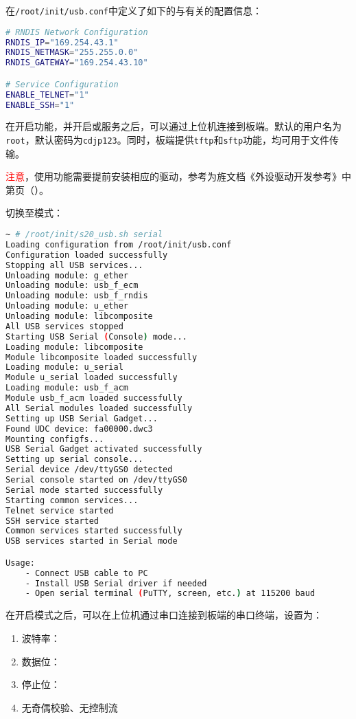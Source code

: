 \documentclass[UTF8]{ctexart}
\newcommand{\code}[1]{\colorbox{gray!10}{\lstinline[style=inlinecode]|#1|}}
\begin{document}
\noindent 在\code{/root/init/usb.conf}中定义了如下的与有关的配置信息：

\begin{lstlisting}[language=sh]
# RNDIS Network Configuration
RNDIS_IP="169.254.43.1"
RNDIS_NETMASK="255.255.0.0"
RNDIS_GATEWAY="169.254.43.10"

# Service Configuration
ENABLE_TELNET="1"
ENABLE_SSH="1"
\end{lstlisting}

\noindent 在开启功能，并开启或服务之后，可以通过上位机连接到板端。默认的用户名为\code{root}，默认密码为\code{cdjp123}。同时，板端提供\code{tftp}和\code{sftp}功能，均可用于文件传输。

\textcolor{red}{注意}，使用功能需要提前安装相应的驱动，参考为旌文档《外设驱动开发参考》中第页（）。

切换至模式：

\begin{lstlisting}[language=sh]
~ # /root/init/s20_usb.sh serial
Loading configuration from /root/init/usb.conf
Configuration loaded successfully
Stopping all USB services...
Unloading module: g_ether
Unloading module: usb_f_ecm
Unloading module: usb_f_rndis
Unloading module: u_ether
Unloading module: libcomposite
All USB services stopped
Starting USB Serial (Console) mode...
Loading module: libcomposite
Module libcomposite loaded successfully
Loading module: u_serial
Module u_serial loaded successfully
Loading module: usb_f_acm
Module usb_f_acm loaded successfully
All Serial modules loaded successfully
Setting up USB Serial Gadget...
Found UDC device: fa00000.dwc3
Mounting configfs...
USB Serial Gadget activated successfully
Setting up serial console...
Serial device /dev/ttyGS0 detected
Serial console started on /dev/ttyGS0
Serial mode started successfully
Starting common services...
Telnet service started
SSH service started
Common services started successfully
USB services started in Serial mode

Usage:
    - Connect USB cable to PC
    - Install USB Serial driver if needed
    - Open serial terminal (PuTTY, screen, etc.) at 115200 baud
\end{lstlisting}

\noindent 在开启模式之后，可以在上位机通过串口连接到板端的串口终端，设置为：

\begin{enumerate}
    \item 波特率：
    \item 数据位：
    \item 停止位：
    \item 无奇偶校验、无控制流
\end{enumerate}
\end{document}
